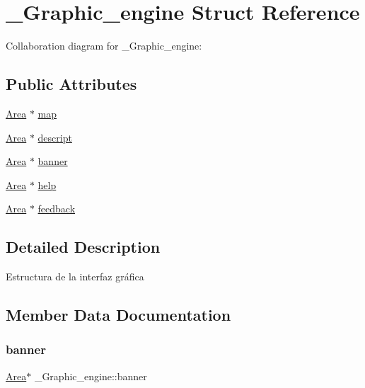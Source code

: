 \hypertarget{struct__Graphic__engine}{}\section{\+\_\+\+Graphic\+\_\+engine Struct Reference}
\label{struct__Graphic__engine}


Collaboration diagram for \+\_\+\+Graphic\+\_\+engine\+:
\subsection*{Public Attributes}
\begin{DoxyCompactItemize}
\item 
\hyperlink{screen_8h_acfdfc42f6522d75fa3c16713afde8127}{Area} $\ast$ \hyperlink{struct__Graphic__engine_a1ea06bb881d335da8c31d63b3e834bdb}{map}
\item 
\hyperlink{screen_8h_acfdfc42f6522d75fa3c16713afde8127}{Area} $\ast$ \hyperlink{struct__Graphic__engine_a414bb888ecce3389c7ce348264758e58}{descript}
\item 
\hyperlink{screen_8h_acfdfc42f6522d75fa3c16713afde8127}{Area} $\ast$ \hyperlink{struct__Graphic__engine_a440dfb2c23c3c4b7d3871187371117b9}{banner}
\item 
\hyperlink{screen_8h_acfdfc42f6522d75fa3c16713afde8127}{Area} $\ast$ \hyperlink{struct__Graphic__engine_ade1d3e95ad6def427f613a4a2d101875}{help}
\item 
\hyperlink{screen_8h_acfdfc42f6522d75fa3c16713afde8127}{Area} $\ast$ \hyperlink{struct__Graphic__engine_a4fc0ef353d000b20d57fb75d898c6d2d}{feedback}
\end{DoxyCompactItemize}


\subsection{Detailed Description}
Estructura de la interfaz gráfica 

\subsection{Member Data Documentation}
\mbox{\label{struct__Graphic__engine_a440dfb2c23c3c4b7d3871187371117b9}} 
\subsubsection{\texorpdfstring{banner}{banner}}
{\footnotesize\ttfamily \hyperlink{screen_8h_acfdfc42f6522d75fa3c16713afde8127}{Area}$\ast$ \+\_\+\+Graphic\+\_\+engine\+::banner}

